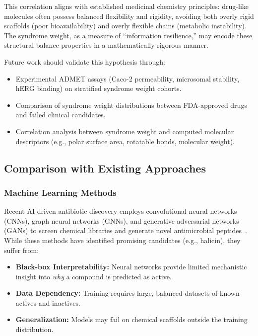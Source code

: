 \documentclass[12pt,a4paper]{article}
\begin{document}
This correlation aligns with established medicinal chemistry principles: drug-like molecules often possess balanced flexibility and rigidity, avoiding both overly rigid scaffolds (poor bioavailability) and overly flexible chains (metabolic instability). The syndrome weight, as a measure of ``information resilience,'' may encode these structural balance properties in a mathematically rigorous manner.

Future work should validate this hypothesis through:

\begin{itemize}
\item Experimental ADMET assays (Caco-2 permeability, microsomal stability, hERG binding) on stratified syndrome weight cohorts.
\item Comparison of syndrome weight distributions between FDA-approved drugs and failed clinical candidates.
\item Correlation analysis between syndrome weight and computed molecular descriptors (e.g., polar surface area, rotatable bonds, molecular weight).
\end{itemize}

\subsection{Comparison with Existing Approaches}

\subsubsection{Machine Learning Methods}

Recent AI-driven antibiotic discovery employs convolutional neural networks (CNNs), graph neural networks (GNNs), and generative adversarial networks (GANs) to screen chemical libraries and generate novel antimicrobial peptides~\cite{Cesaro2023DeepLearning}. While these methods have identified promising candidates (e.g., halicin), they suffer from:

\begin{itemize}
\item \textbf{Black-box Interpretability:} Neural networks provide limited mechanistic insight into \textit{why} a compound is predicted as active.
\item \textbf{Data Dependency:} Training requires large, balanced datasets of known actives and inactives.
\item \textbf{Generalization:} Models may fail on chemical scaffolds outside the training distribution.
\end{itemize}
\end{document}
